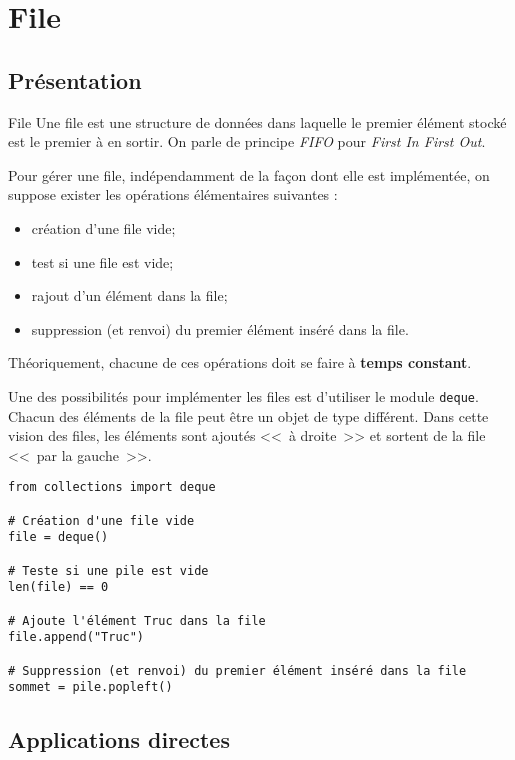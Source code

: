 \section{File}
\subsection{Présentation}
\begin{defi}{File}
Une file est une structure de données dans laquelle le premier élément stocké est le premier à en sortir. On parle de principe \textit{FIFO} pour \textit{First In First Out}. 
\end{defi}

Pour gérer une file, indépendamment de la façon dont elle est implémentée, on suppose exister les opérations élémentaires suivantes : 
\begin{itemize}
\item création d'une file vide;
\item test si une file est vide;
\item rajout d'un élément dans la file;
\item suppression (et renvoi) du premier élément inséré dans la file.
\end{itemize}

Théoriquement, chacune de ces opérations doit se faire à \textbf{temps constant}.

Une des possibilités pour implémenter les files est d'utiliser le module \texttt{deque}. Chacun des éléments de la file peut être un objet de type différent. Dans cette vision des files, les éléments sont ajoutés <<~à droite~>> et sortent de la file <<~par la gauche~>>.

\begin{lstlisting} 
from collections import deque

# Création d'une file vide
file = deque() 

# Teste si une pile est vide
len(file) == 0

# Ajoute l'élément Truc dans la file 
file.append("Truc")

# Suppression (et renvoi) du premier élément inséré dans la file
sommet = pile.popleft()

\end{lstlisting}


\subsection{Applications directes}

